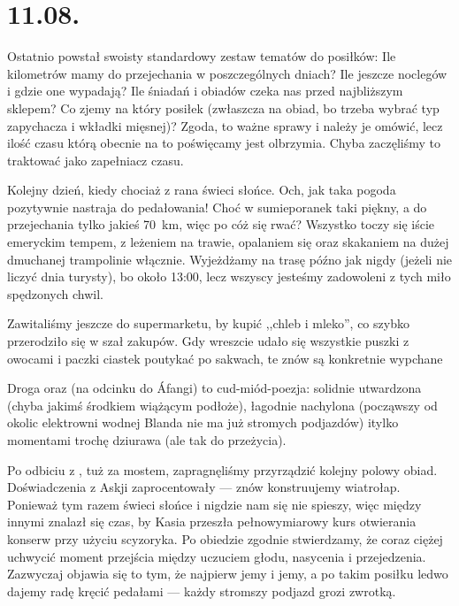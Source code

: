 \chapter*{11.08.}


Ostatnio powstał swoisty standardowy zestaw tematów do posiłków: Ile kilometrów mamy do przejechania w poszczególnych dniach? Ile jeszcze noclegów i gdzie one wypadają? Ile śniadań i obiadów czeka nas przed najbliższym sklepem? Co zjemy na który posiłek (zwłaszcza na obiad, bo trzeba wybrać typ zapychacza i wkładki mięsnej)? Zgoda, to ważne sprawy i należy je omówić, lecz ilość czasu którą obecnie na to poświęcamy jest olbrzymia. Chyba zaczęliśmy to traktować jako zapełniacz czasu.

Kolejny dzień, kiedy chociaż z rana świeci słońce. Och, jak taka pogoda pozytywnie nastraja do pedałowania! Choć w sumie\textellipsis poranek taki piękny, a do przejechania tylko jakieś 70~km, więc po cóż się rwać? Wszystko toczy się iście emeryckim tempem, z leżeniem na trawie, opalaniem się oraz skakaniem na dużej dmuchanej trampolinie włącznie. Wyjeżdżamy na trasę późno jak nigdy (jeżeli nie liczyć dnia turysty), bo około 13:00, lecz wszyscy jesteśmy zadowoleni z tych miło spędzonych chwil.


Zawitaliśmy jeszcze do supermarketu, by kupić ,,chleb i mleko'', co szybko przerodziło się w szał zakupów. Gdy wreszcie udało się wszystkie puszki z owocami i paczki ciastek poutykać po sakwach, te znów są konkretnie wypchane \smile

Droga  oraz  (na odcinku do Áfangi) to cud-miód-poezja: solidnie utwardzona (chyba jakimś środkiem wiążącym podłoże), łagodnie nachylona (począwszy od okolic elektrowni wodnej Blanda nie ma już stromych podjazdów) i\textellipsis tylko momentami trochę dziurawa (ale tak do przeżycia).

Po odbiciu z , tuż za mostem, zapragnęliśmy przyrządzić kolejny polowy obiad. Doświadczenia z Askji zaprocentowały --- znów konstruujemy wiatrołap. Ponieważ tym razem świeci słońce i nigdzie nam się nie spieszy, więc między innymi znalazł się czas, by Kasia przeszła pełnowymiarowy kurs otwierania konserw przy użyciu scyzoryka. Po obiedzie zgodnie stwierdzamy, że coraz ciężej uchwycić moment przejścia między uczuciem głodu, nasycenia i przejedzenia. Zazwyczaj objawia się to tym, że najpierw jemy i jemy, a po takim posiłku ledwo dajemy radę kręcić pedałami --- każdy stromszy podjazd grozi zwrotką.

